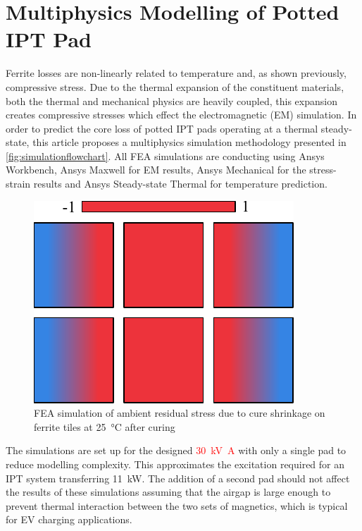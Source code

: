 \documentclass[conference]{IEEEtran}
\begin{document}
\lipsum[1]

\section{Multiphysics Modelling of Potted IPT Pad}
\label{sec:modelling}

Ferrite losses are non-linearly related to temperature and, as shown previously, compressive stress. 
Due to the thermal expansion of the constituent materials, both the thermal and mechanical physics are heavily coupled, this expansion creates compressive stresses which effect the electromagnetic (EM) simulation. 
In order to predict the core loss of potted IPT pads operating at a thermal steady-state, this article proposes a multiphysics simulation methodology presented in \cref{fig:simulationflowchart}. 
All FEA simulations are conducting using Ansys Workbench, Ansys Maxwell for EM results, Ansys Mechanical for the stress-strain results and Ansys Steady-state Thermal for temperature prediction. 

\begin{figure}[t]
  \centering
  \includegraphics{figures/simulatedpottingpadstresses.pdf}
  \caption{FEA simulation of ambient residual stress due to cure shrinkage on ferrite tiles at \SI{25}{\celsius} after curing}
  \label{fig:pottingstresses}
\end{figure}

The simulations are set up for the designed \textcolor{red}{\SI{30}{\kilo\volt\ampere}} with only a single pad to reduce modelling complexity. 
This approximates the excitation required for an IPT system transferring \SI{11}{\kilo\watt}. 
The addition of a second pad should not affect the results of these simulations assuming that the airgap is large enough to prevent thermal interaction between the two sets of magnetics, which is typical for EV charging applications.
\end{document}
